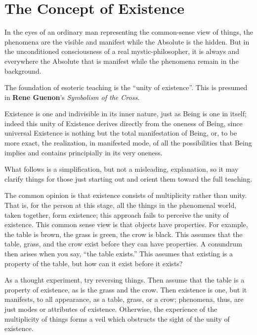 \section{The Concept of Existence}

\begin{quotex}
In the eyes of an ordinary man representing the common-sense view of things, the phenomena are the visible and manifest while the Absolute is the hidden. But in the unconditioned consciousness of a real mystic-philosopher, it is always and everywhere the Absolute that is manifest while the phenomena remain in the background. 

\end{quotex}
The foundation of esoteric teaching is the “unity of existence”. This is presumed in \textbf{Rene Guenon}'s \emph{Symbolism of the Cross}.

\begin{quotex}
Existence is one and indivisible in its inner nature, just as Being is one in itself; indeed this unity of Existence derives directly from the oneness of Being, since universal Existence is nothing but the total manifestation of Being, or, to be more exact, the realization, in manifested mode, of all the possibilities that Being implies and contains principially in its very oneness.

\end{quotex}
What follows is a simplification, but not a misleading, explanation, so it may clarify things for those just starting out and orient them toward the full teaching.

The common opinion is that existence consists of multiplicity rather than unity. That is, for the person at this stage, all the things in the phenomenal world, taken together, form existence; this approach fails to perceive the unity of existence. This common sense view is that objects have properties. For example, the table is brown, the grass is green, the crow is black. This assumes that the table, grass, and the crow exist before they can have properties. A conundrum then arises when you say, “the table exists.” This assumes that existing is a property of the table, but how can it exist before it exists?

As a thought experiment, try reversing things. Then assume that the table is a property of existence, as is the grass and the crow. Then existence is one, but it manifests, to all appearance, as a table, grass, or a crow; phenomena, thus, are just modes or attributes of existence. Otherwise, the experience of the multiplicity of things forms a veil which obstructs the sight of the unity of existence.

